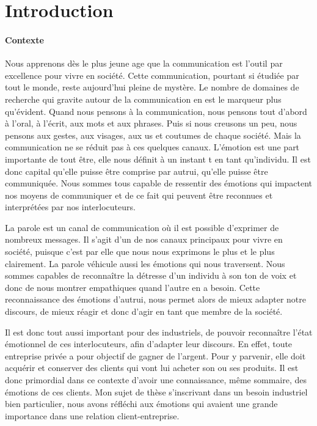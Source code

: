 \chapter*{Introduction}

\subsubsection{Contexte}

Nous apprenons dès le plus jeune age que la communication est l'outil par excellence pour vivre en société. Cette communication, pourtant si étudiée par tout le monde, reste aujourd'hui pleine de mystère. Le nombre de domaines de recherche qui gravite autour de la communication en est le marqueur plus qu'évident. Quand nous pensons à la communication, nous pensons tout d'abord à l'oral, à l'écrit, aux mots et aux phrases. Puis si nous creusons un peu, nous pensons aux gestes, aux visages, aux us et coutumes de chaque société. Mais la communication ne se réduit pas à ces quelques canaux. L'émotion est une part importante de tout être, elle nous définit à un instant t en tant qu'individu. Il est donc capital qu'elle puisse être comprise par autrui, qu'elle puisse être communiquée. Nous sommes tous capable de ressentir des émotions qui impactent nos moyens de communiquer et de ce fait qui peuvent être reconnues et interprétées par nos interlocuteurs.

La parole est un canal de communication où il est possible d'exprimer de nombreux messages. Il s'agit d'un de nos canaux principaux pour vivre en société, puisque c'est par elle que nous nous exprimons le plus et le plus clairement. La parole véhicule aussi les émotions qui nous traversent. Nous sommes capables de reconnaître la détresse d'un individu à son ton de voix et donc de nous montrer empathiques quand l'autre en a besoin. Cette reconnaissance des émotions d'autrui, nous permet alors de mieux adapter notre discours, de mieux réagir et donc d'agir en tant que membre de la société.

Il est donc tout aussi important pour des industriels, de pouvoir reconnaître l'état émotionnel de ces interlocuteurs, afin d'adapter leur discours. En effet, toute entreprise privée a pour objectif de gagner de l'argent. Pour y parvenir, elle doit acquérir et conserver des clients qui vont lui acheter son ou ses produits. Il est donc primordial dans ce contexte d'avoir une connaissance, même sommaire, des émotions de ces clients. Mon sujet de thèse s'inscrivant dans un besoin industriel bien particulier, nous avons réfléchi aux émotions qui avaient une grande importance dans une relation client-entreprise.

